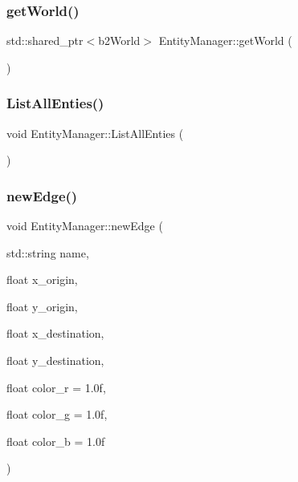 \mbox{\label{classEntityManager_ae684073af9ce6ab6e59cc9974c5f8a4c}} 
\subsubsection{\texorpdfstring{get\+World()}{getWorld()}}
{\footnotesize\ttfamily std\+::shared\+\_\+ptr$<$b2\+World$>$ Entity\+Manager\+::get\+World (\begin{DoxyParamCaption}{ }\end{DoxyParamCaption})\hspace{0.3cm}{\ttfamily [inline]}}

\mbox{\label{classEntityManager_ad16c34fbdcb0da9e9a3e1c59887d6e52}} 
\subsubsection{\texorpdfstring{List\+All\+Enties()}{ListAllEnties()}}
{\footnotesize\ttfamily void Entity\+Manager\+::\+List\+All\+Enties (\begin{DoxyParamCaption}{ }\end{DoxyParamCaption})}

\mbox{\label{classEntityManager_a086131de1baa9936e0ffc6830bbe5039}} 
\subsubsection{\texorpdfstring{new\+Edge()}{newEdge()}}
{\footnotesize\ttfamily void Entity\+Manager\+::new\+Edge (\begin{DoxyParamCaption}\item[{std\+::string}]{name,  }\item[{float}]{x\+\_\+origin,  }\item[{float}]{y\+\_\+origin,  }\item[{float}]{x\+\_\+destination,  }\item[{float}]{y\+\_\+destination,  }\item[{float}]{color\+\_\+r = {\ttfamily 1.0f},  }\item[{float}]{color\+\_\+g = {\ttfamily 1.0f},  }\item[{float}]{color\+\_\+b = {\ttfamily 1.0f} }\end{DoxyParamCaption})}

